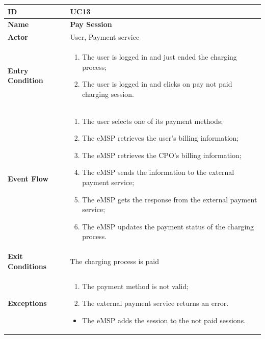 \documentclass{Configuration_Files/PoliMi3i_thesis}
\begin{document}
\begin{table}[H]
    \begin{xltabular}{\textwidth}{| >{}l | X |}
    \hline
    \textbf{ID} & \textbf{UC13}\T\B\\
    \hline
    \textbf{Name} & \textbf{Pay Session}\T\B\\
    \hline \hline
    \textbf{Actor} & User, Payment service\T\B \\
    \hline
    \textbf{Entry Condition} & 
    \begin{enumerate}
        \item The user is logged in and just ended the charging process;
        \item The user is logged in and clicks on pay not paid charging session.
    \end{enumerate}\T\B\\
    \hline
    \textbf{Event Flow} & 
        \begin{enumerate}
        \item The user selects one of its payment methods;
        \item The eMSP retrieves the user’s billing information;
        \item The eMSP retrieves the CPO’s billing information;
        \item The eMSP sends the information to the external payment service;
        \item The eMSP gets the response from the external payment service;
        \item The eMSP updates the payment status of the charging process.
        \end{enumerate}\B\\
    \hline
    \textbf{Exit Conditions} & The charging process is paid\B\\
    \hline
    \textbf{Exceptions} & 
    \begin{enumerate}
        \item The payment method is not valid;
        \item The external payment service returns an error.
    \end{enumerate}
    \begin{itemize}
        \item The eMSP adds the session to the not paid sessions.
    \end{itemize}\B\\
    \hline
    \end{xltabular}
\end{table}
\end{document}
